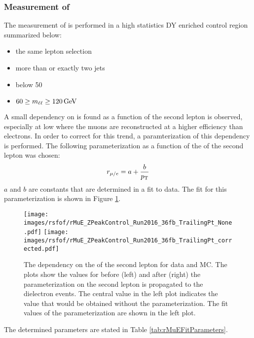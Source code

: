 \subsubsection*{Measurement of \rmue}
\noindent
\justify
The measurement of \rmue is performed in a high statistics DY enriched control region summarized below:
\begin{itemize}
    \item the same lepton selection
    \item more than or exactly two jets
    \item \ptmiss below 50\GeV
    \item $60\geq m_{\ell\ell}\geq120\,\text{Ge\hspace{-.08em}V}$
\end{itemize}                                 
A small dependency on \rmue is found as a function of the second lepton \pt is observed, especially at low \pt where the muons are reconstructed at a higher efficiency than electrons.  
In order to correct for this trend, a paramterization of this dependency is performed. The following parameterization as a function of the \pt of the second lepton was chosen:
\begin{equation}
    r_{\mu/e}  = a +  \frac{b}{p_{\mathrm{T}}}
\label{eq:rMuEFormular}
\end{equation}
$a$ and $b$ are constants that are determined in a fit to data.
The fit for this parameterization is shown in Figure \ref{fig:rMuEDependency}.
\begin{figure}[htbp!]
\begin{center}
    \texttt{[image: images/rsfof/rMuE\_ZPeakControl\_Run2016\_36fb\_TrailingPt\_None.pdf]}
    \texttt{[image: images/rsfof/rMuE\_ZPeakControl\_Run2016\_36fb\_TrailingPt\_corrected.pdf]}
    \caption{The \rmue dependency on the \pt of the second lepton for data and MC. The plots show the values for \rmue before (left) and after (right) the parameterization on the second lepton \pt is propagated to the dielectron events. The central value in the left plot indicates the \rmue value that would be obtained without the parameterization. The fit values of the parameterization are shown in the left plot.}
\label{fig:rMuEDependency}
\end{center}
\end{figure}                                                                                                                
The determined parameters are stated in Table \ref{tab:rMuEFitParameters}.
